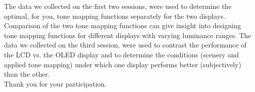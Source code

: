 \documentclass[11pt, oneside]{article}   	%
\begin{document}
The data we collected on the first two sessions, were used to determine the optimal, for you, tone mapping functions separately for the two displays. Comparison of the two tone mapping functions can give insight into designing tone mapping functions for different displays with varying luminance ranges. The data we collected on the third session, were used to contrast the performance of the LCD vs. the OLED display and to determine the conditions (scenery and applied tone mapping) under which one display performs better (subjectively) than the other.\\

Thank you for your participation.

\end{document}
